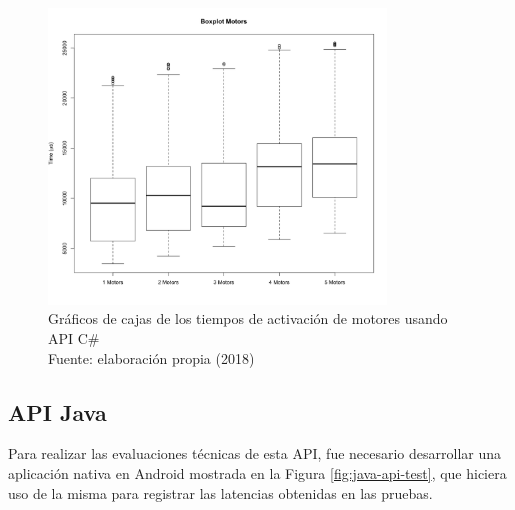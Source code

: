 \begin{figure}[H]
  \begin{center} 
   	\includegraphics[width=0.8\textwidth]{evaluation/graphics/Xamarin/Galaxy-APITest/BoxplotMotorsXamarinGalaxy-APITest.png} 
   	\centering
   	\captionsetup{justification=centering}
    \caption[Gráficos de cajas de los tiempos de activación de motores usando API C\# ]{Gráficos de cajas de los tiempos de activación de motores usando API C\# \\Fuente: elaboración propia (2018)} 
    \label{fig:xamarin-galaxy-boxplot-motors-api}
  \end{center}
\end{figure}




\subsection{API Java}
Para realizar las evaluaciones técnicas de esta API, fue necesario desarrollar una aplicación nativa en Android mostrada en la Figura \ref{fig:java-api-test}, que hiciera uso de la misma para registrar las latencias obtenidas en las pruebas.
